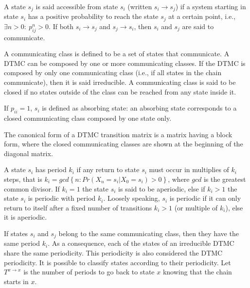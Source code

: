 \documentclass[
  nojss]{jss}
\begin{document}
A state \(s_{j}\) is said accessible from state \(s_{i}\) (written \(s_{i}\rightarrow s_{j}\)) if a system starting in state \(s_{i}\) has a positive probability to reach the state \(s_{j}\) at a certain point, i.e., \(\exists n>0:\: p_{ij}^{n}>0\). If both \(s_{i}\rightarrow s_{j}\) and \(s_{j}\rightarrow s_{i}\), then
\(s_{i}\) and \(s_{j}\) are said to communicate.

A communicating class is defined to be a set of states that communicate. A DTMC can be composed by one or more communicating classes. If the DTMC is composed by only one communicating class (i.e., if all states in the chain communicate), then it is said irreducible. A communicating class is said to be closed if no states outside of the class can be reached from any state inside it.

If \(p_{ii}=1\), \(s_{i}\) is defined as absorbing state: an absorbing state corresponds to a closed communicating class composed by one state only.

The canonical form of a DTMC transition matrix is a matrix having a block form, where the closed communicating classes are shown at the beginning of the diagonal matrix.

A state \(s_{i}\) has period \(k_{i}\) if any return to state \(s_{i}\) must occur in multiplies of \(k_{i}\) steps, that is \(k_{i}=gcd\left\{ n:Pr\left(X_{n}=s_{i}\left|X_{0}=s_{i}\right.\right)>0\right\}\), where \(gcd\) is the greatest common divisor. If \(k_{i}=1\) the state \(s_{i}\) is said to be aperiodic, else if \(k_{i}>1\) the state \(s_{i}\) is periodic with period \(k_{i}\). Loosely speaking, \(s_{i}\) is periodic if it can only return to itself after a fixed number of transitions \(k_{i}>1\) (or multiple of \(k_{i}\)), else it is aperiodic.

If states \(s_{i}\) and \(s_{j}\) belong to the same communicating class, then they have the same period \(k_{i}\). As a consequence, each of the states of an irreducible DTMC share the same periodicity. This periodicity is also considered the DTMC periodicity. It is possible to classify states according to their periodicity. Let \(T^{x\rightarrow x}\) is the number of periods to go back to state \(x\) knowing that the chain starts in \(x\).
\end{document}
